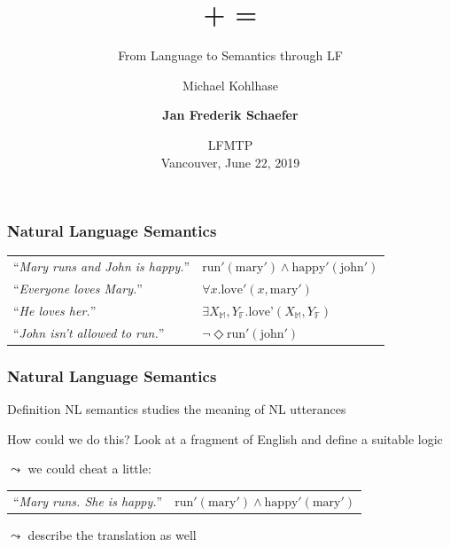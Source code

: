 \documentclass[dvipsnames]{beamer}
\title{\GF + \MMT = \GLF}
\subtitle{From Language to Semantics through LF}
\author{Michael Kohlhase \and \textbf{Jan Frederik Schaefer}}
\institute{Friedrich-Alexander-Universit\"at Erlangen-N\"urnberg}
\date{LFMTP \\ Vancouver, June 22, 2019}
\def\str#1{``\textit{#1}''}   %
\def\log#1{#1}  %
\begin{document}


\frame{\titlepage}


\begin{frame}
    \frametitle{Natural Language Semantics}

    \begin{tabular}{l l}
        \vspace{2em}
        \str{Mary runs and John is happy.} & \log{$\text{run}'(\text{mary}') \land \text{happy}'(\text{john}')$} \\
        \vspace{2em}
        \str{Everyone loves Mary.} & \log{$\forall x.\text{love}'(x, \text{mary}')$} \\
        \vspace{2em}
        \str{He loves her.} & \log{$\exists X_\mathbb{M}, Y_\mathbb{F}.\text{love'}(X_\mathbb{M}, Y_\mathbb{F})$} \\
        \vspace{2em}
        \str{John isn't allowed to run.} & \log{$\neg \Diamond \text{run}'(\text{john}')$} \\
    \end{tabular}
\end{frame}


\begin{frame}
    \frametitle{Natural Language Semantics}
    \begin{block}{Definition}
        NL semantics studies the meaning of NL utterances
    \end{block}
    \vspace{1.5em}

    \begin{block}{How could we do this?}
        Look at a fragment of English and define a suitable logic~\cite{Montague:efl70}
        \vspace{0.5em}

        $\leadsto$ we could cheat a little:
        \vspace{0.5em}

        \begin{tabular}{l l}
            \str{Mary runs. She is happy.} & \log{$\text{run}'(\text{mary}') \land \text{happy}'(\text{mary}')$} \\
        \end{tabular}
        \vspace{0.5em}

        $\leadsto$ describe the translation as well

    \end{block}
\end{frame}
\end{document}

